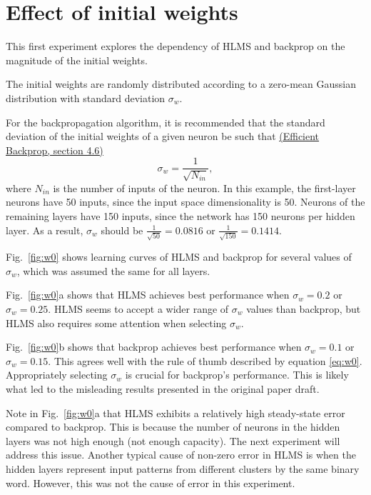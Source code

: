 \documentclass[a4paper]{article}
\begin{document}
\newpage
\section*{Effect of initial weights}

This first experiment explores the dependency of HLMS and backprop on the magnitude of the initial weights. 

The initial weights are randomly distributed according to a zero-mean Gaussian distribution with standard deviation $\sigma_w$.

For the backpropagation algorithm, it is recommended that the standard deviation of the initial weights of a given neuron be such that 
\href{http://yann.lecun.com/exdb/publis/pdf/lecun-98b.pdf}{(Efficient Backprop, section 4.6)}
\begin{equation} \label{eq:w0}
\sigma_w = \frac{1}{\sqrt{N_{in}}},
\end{equation}
where $N_{in}$ is the number of inputs of the neuron. In this example, the first-layer neurons have 50 inputs, since the input space dimensionality is 50. Neurons of the remaining layers have 150 inputs, since the network has 150 neurons per hidden layer. As a result, $\sigma_w$ should be $\frac{1}{\sqrt{50}} = 0.0816$ or $\frac{1}{\sqrt{150}} = 0.1414$.

Fig.~\ref{fig:w0} shows learning curves of HLMS and backprop for several values of $\sigma_w$, which was assumed the same for all layers. 

Fig.~\ref{fig:w0}a shows that HLMS achieves best performance when $\sigma_w = 0.2$ or $\sigma_w = 0.25$. HLMS seems to accept a wider range of $\sigma_w$ values than backprop, but HLMS also requires some attention when selecting $\sigma_w$. 

Fig.~\ref{fig:w0}b shows that backprop achieves best performance when $\sigma_w = 0.1$ or $\sigma_w = 0.15$. This agrees well with the rule of thumb described by equation \eqref{eq:w0}. Appropriately selecting $\sigma_w$ is crucial for backprop's performance. This is likely what led to the misleading results presented in the original paper draft.

Note in Fig.~\ref{fig:w0}a that HLMS exhibits a relatively high steady-state error compared to backprop. This is because the number of neurons in the hidden layers was not high enough (not enough capacity). The next experiment will address this issue. Another typical cause of non-zero error in HLMS is when the hidden layers represent input patterns from different clusters by the same binary word. However, this was not the cause of error in this experiment.
\end{document}
